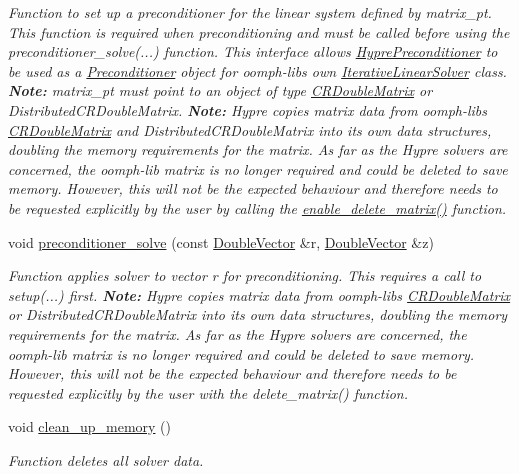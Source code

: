 \begin{DoxyCompactItemize}
\begin{DoxyCompactList}\small\item\em Function to set up a preconditioner for the linear system defined by matrix\+\_\+pt. This function is required when preconditioning and must be called before using the preconditioner\+\_\+solve(...) function. This interface allows \hyperlink{classoomph_1_1HyprePreconditioner}{Hypre\+Preconditioner} to be used as a \hyperlink{classoomph_1_1Preconditioner}{Preconditioner} object for oomph-\/lib\textquotesingle{}s own \hyperlink{classoomph_1_1IterativeLinearSolver}{Iterative\+Linear\+Solver} class. {\bfseries Note\+:} matrix\+\_\+pt must point to an object of type \hyperlink{classoomph_1_1CRDoubleMatrix}{C\+R\+Double\+Matrix} or Distributed\+C\+R\+Double\+Matrix. {\bfseries Note\+:} Hypre copies matrix data from oomph-\/lib\textquotesingle{}s \hyperlink{classoomph_1_1CRDoubleMatrix}{C\+R\+Double\+Matrix} and Distributed\+C\+R\+Double\+Matrix into its own data structures, doubling the memory requirements for the matrix. As far as the Hypre solvers are concerned, the oomph-\/lib matrix is no longer required and could be deleted to save memory. However, this will not be the expected behaviour and therefore needs to be requested explicitly by the user by calling the \hyperlink{classoomph_1_1HyprePreconditioner_a350716ddfca241e83904895e0d5c3f6f}{enable\+\_\+delete\+\_\+matrix()} function. \end{DoxyCompactList}\item 
void \hyperlink{classoomph_1_1HyprePreconditioner_ad4967b01386d24d1839bccb99b2f9560}{preconditioner\+\_\+solve} (const \hyperlink{classoomph_1_1DoubleVector}{Double\+Vector} \&r, \hyperlink{classoomph_1_1DoubleVector}{Double\+Vector} \&z)
\begin{DoxyCompactList}\small\item\em Function applies solver to vector r for preconditioning. This requires a call to setup(...) first. {\bfseries Note\+:} Hypre copies matrix data from oomph-\/lib\textquotesingle{}s \hyperlink{classoomph_1_1CRDoubleMatrix}{C\+R\+Double\+Matrix} or Distributed\+C\+R\+Double\+Matrix into its own data structures, doubling the memory requirements for the matrix. As far as the Hypre solvers are concerned, the oomph-\/lib matrix is no longer required and could be deleted to save memory. However, this will not be the expected behaviour and therefore needs to be requested explicitly by the user with the delete\+\_\+matrix() function. \end{DoxyCompactList}\item 
void \hyperlink{classoomph_1_1HyprePreconditioner_a4d2ffc88b3a9e9ba84f969211b433231}{clean\+\_\+up\+\_\+memory} ()
\begin{DoxyCompactList}\small\item\em Function deletes all solver data. \end{DoxyCompactList}\end{DoxyCompactItemize}

